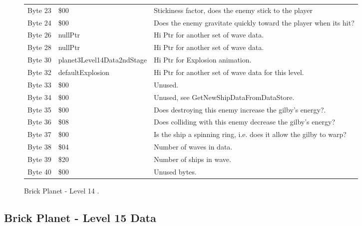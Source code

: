 \begin{figure}[H]
{\begin{adjustbox}{width=12cm}
\begin{tabular}{lll}
 Byte 23 & \$00                        & Stickiness factor, does the enemy stick to the player              \\
 Byte 24 & \$00                        & Does the enemy gravitate quickly toward the player when its hit?   \\
 Byte 26 & nullPtr                    & Hi Ptr for another set of wave data.                               \\
 Byte 28 & nullPtr                    & Hi Ptr for another set of wave data.                               \\
 Byte 30 & planet3Level14Data2ndStage & Hi Ptr for Explosion animation.                                    \\
 Byte 32 & defaultExplosion           & Hi Ptr for another set of wave data for this level.                \\
 Byte 33 & \$00                        & Unused.                                                            \\
 Byte 34 & \$00                        & Unused, see GetNewShipDataFromDataStore.                           \\
 Byte 35 & \$00                        & Does destroying this enemy increase the gilby's energy?.           \\
 Byte 36 & \$08                        & Does colliding with this enemy decrease the gilby's energy?        \\
 Byte 37 & \$00                        & Is the ship a spinning ring, i.e. does it allow the gilby to warp? \\
 Byte 38 & \$04                        & Number of waves in data.                                           \\
 Byte 39 & \$20                        & Number of ships in wave.                                           \\
 Byte 40 & \$00                        & Unused bytes.                                                      \\
\bottomrule
\end{tabular}

  \end{adjustbox}

  }\caption*{Brick Planet - Level 14
.}
\end{figure}

\clearpage
\subsection{Brick Planet - Level 15 Data}


